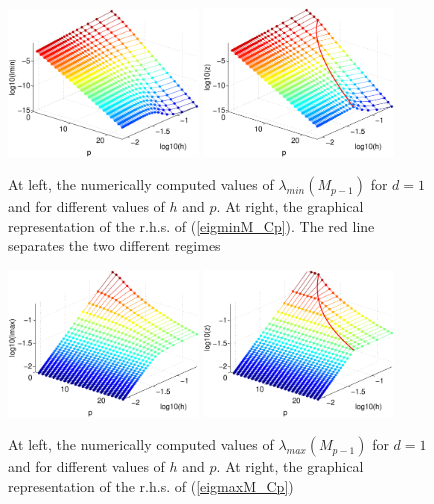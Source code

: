 \documentclass[11pt]{article}
\begin{document}
\begin{figure}[h]
\begin{center}
\includegraphics[width=0.45\textwidth]{Images/igap_eigM1min.eps}\quad
\includegraphics[width=0.45\textwidth]{Images/igap_eigM1smin.eps}\\
\end{center}
\caption{At left, the numerically computed values of
$\lambda_{min}(M_{p-1})$ for $d=1$ and
for different values of $h$ and $p$. At right,
the graphical representation of the r.h.s. of (\ref{eigminM_Cp}). The red line
separates the two different regimes}
\label{fig:massmin-igapd1}
\end{figure}

\begin{figure}
\begin{center}
\includegraphics[width=0.45\textwidth]{Images/igap_eigM1max.eps}\quad
\includegraphics[width=0.45\textwidth]{Images/igap_eigM1smax.eps}\\
\end{center}
\caption{At left, the numerically computed values of
$\lambda_{max}(M_{p-1})$ for $d=1$ and
for different values of $h$ and $p$. At right,
the graphical representation of the r.h.s. of (\ref{eigmaxM_Cp})}
\label{fig:massmax-igapd1}
\end{figure}
\end{document}
